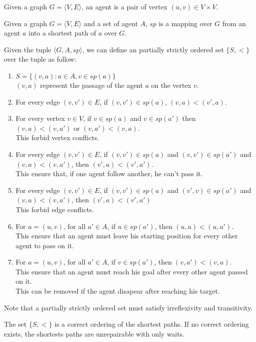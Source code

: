 Given a graph $G=\langle V,E \rangle$,
an agent is a pair of vertex $(u,v) \in {V\times V}$.

Given a graph $G=\langle V,E \rangle$ and a set of agent $A$,
$sp$ is a mapping over $G$ from an agent $a$ into a shortest path of $a$ over $G$.

Given the tuple $\langle G,A,sp \rangle$,
we can define an partially strictly ordered set $\{S,<\}$ over the tuple as follow:

\begin{enumerate}
  \item $S = \{(v,a) : a \in A, v \in sp(a)\}$
  \\ $(v,a)$ represent the passage of the agent $a$ on the vertex $v$.
  \item For every edge $(v,v') \in E$, if $(v,v') \in sp(a)$, $(v,a)<(v',a)$.\label{succ}
  \item For every vertex $v \in V$, if $v \in sp(a)$ and $v \in sp(a')$
  then $(v,a)<(v,a')$ or $(v,a')<(v,a)$.
  \\ This forbid vertex conflicts.\label{vercon}
  \item For every edge $(v,v') \in E$, if $(v,v') \in sp(a)$ and $(v,v') \in sp(a')$ and $(v,a)<(v,a')$, then $(v',a)<(v',a')$.
  \\ This ensure that, if one agent follow another, he can't pass it.
  \item For every edge $(v,v') \in E$, if $(v,v') \in sp(a)$ and $(v',v) \in sp(a')$ and $(v,a)<(v,a')$, then $(v',a)<(v',a')$
  \\ This forbid edge conflicts.\label{edgcon}
  \item For $a=(u,v)$, for all $a'\in A$, if $u \in sp(a')$, then $(u,a)<(u,a')$.
  \\ This ensure that an agent must leave his starting position for every other agent to pass on it.
  \item For $a=(u,v)$, for all $a'\in A$, if $v \in sp(a')$, then $(v,a')<(v,a)$.
  \\ This ensure that an agent must reach his goal after every other agent passed on it.
  \\ This can be removed if the agent disapear after reaching his target.
\end{enumerate}

Note that a partially strictly ordered set must satisfy irreflexivity and transitivity.

The set $\{S,<\}$ is a correct ordering of the shortest paths.
If no correct ordering exists, the shortests paths are unrepairable with only waits.

